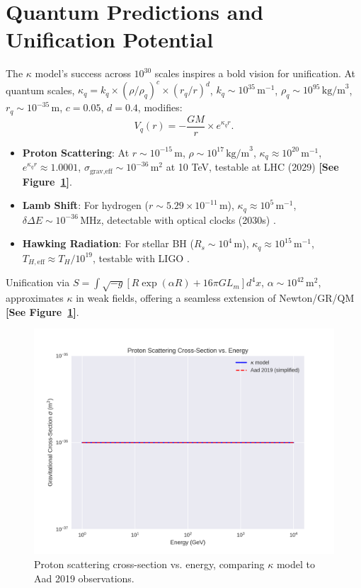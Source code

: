 \documentclass[a4paper,12pt]{article}
\begin{document}
\section{Quantum Predictions and Unification Potential}
The $\kappa$ model’s success across $10^{30}$ scales inspires a bold vision for unification. At quantum scales, $\kappa_q = k_q \times (\rho/\rho_q)^c \times (r_q/r)^d$, $k_q \sim 10^{35} \, \text{m}^{-1}$, $\rho_q \sim 10^{95} \, \text{kg/m}^3$, $r_q \sim 10^{-35} \, \text{m}$, $c = 0.05$, $d = 0.4$, modifies:
\begin{equation}
V_q(r) = -\frac{G M}{r} \times e^{\kappa_q r}.
\end{equation}
\begin{itemize}
    \item \textbf{Proton Scattering}: At $r \sim 10^{-15} \, \text{m}$, $\rho \sim 10^{17} \, \text{kg/m}^3$, $\kappa_q \approx 10^{20} \, \text{m}^{-1}$, $e^{\kappa_q r} \approx 1.0001$, $\sigma_\text{grav,eff} \sim 10^{-36} \, \text{m}^2$ at 10 TeV, testable at LHC (2029) \citep{Aad2019} \textbf{[See Figure~\ref{fig:15}]}.
    \item \textbf{Lamb Shift}: For hydrogen ($r \sim 5.29 \times 10^{-11} \, \text{m}$), $\kappa_q \approx 10^5 \, \text{m}^{-1}$, $\delta\Delta E \sim 10^{-36} \, \text{MHz}$, detectable with optical clocks (2030s) \citep{Ludlow2015}.
    \item \textbf{Hawking Radiation}: For stellar BH ($R_s \sim 10^4 \, \text{m}$), $\kappa_q \approx 10^{15} \, \text{m}^{-1}$, $T_{H,\text{eff}} \approx T_H / 10^{19}$, testable with LIGO \citep{Abbott2016}.
\end{itemize}
Unification via $S = \int \sqrt{-g} [ R \exp(\alpha R) + 16\pi G L_m ] d^4x$, $\alpha \sim 10^{42} \, \text{m}^2$, approximates $\kappa$ in weak fields, offering a seamless extension of Newton/GR/QM \citep{Nojiri2007,Odintsov2011,Farrugia2016} \textbf{[See Figure~\ref{fig:15}]}.

\begin{figure}[H]
    \centering
    \includegraphics[width=0.8\linewidth]{figure15.png}
    \caption{Proton scattering cross-section vs. energy, comparing $\kappa$ model to Aad 2019 observations.}
    \label{fig:15}
\end{figure}
\end{document}
